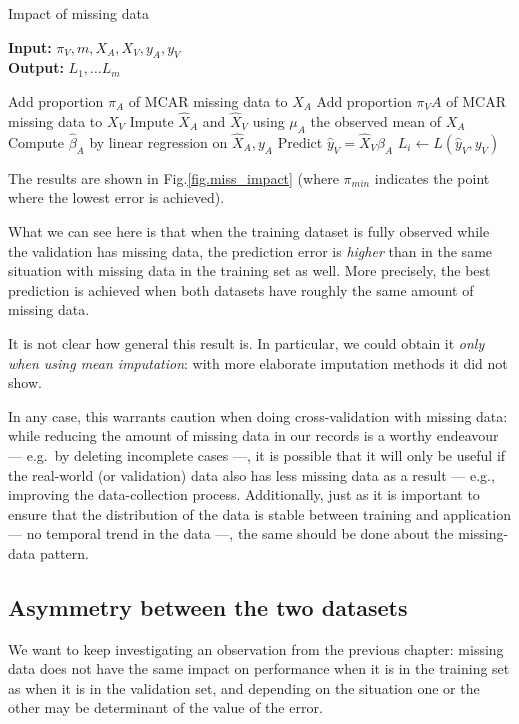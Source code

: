 \begin{algorithm}[H]
	\caption{Impact of missing data}
	\hspace*{\algorithmicindent} \textbf{Input:} $\pi_V, m, X_A, X_V, y_A,y_V$  \\
	\hspace*{\algorithmicindent} \textbf{Output:} $L_1, \ldots L_m$  \\
	\begin{algorithmic}[1]
			\State Add proportion $\pi_A$ of MCAR missing data to $X_A$
			\State Add proportion $\pi_VA$ of MCAR missing data to $X_V$
			\State Impute $\hat{X}_A$ and $\hat{X}_V$ using $\mu_A$ the observed mean of $X_A$
			\State Compute $\hat{\beta}_A$ by linear regression on $\hat{X}_A, y_A$
			\State Predict $\hat{y}_V = \hat{X}_V \hat{\beta}_A$
			\State $L_i \leftarrow L(\hat{y}_V, y_V)$
		\EndFor
	\end{algorithmic}
\end{algorithm}

The results are shown in Fig.\ref{fig.miss_impact} (where $\pi_{min}$ indicates the point where the lowest error is achieved).



What we can see here is that when the training dataset is fully observed while the validation has missing data, the prediction error is \emph{higher} than in the same situation with missing data in the training set as well. More precisely, the best prediction is achieved when both datasets have roughly the same amount of missing data.

It is not clear how general this result is. In particular, we could obtain it \emph{only when using mean imputation}: with more elaborate imputation methods it did not show. 

 In any case, this warrants caution when doing cross-validation with missing data: while reducing the amount of missing data in our records is a worthy endeavour --- e.g.\ by deleting incomplete cases ---, it is possible that it will only be useful if the real-world (or validation) data also has less missing data as a result --- e.g., improving the data-collection process. Additionally, just as it is important to ensure that the distribution of the data is stable between training and application --- no temporal trend in the data ---, the same should be done about the missing-data pattern.

		\subsection{Asymmetry between the two datasets}
We want to keep investigating an observation from the previous chapter: missing data does not have the same impact on performance when it is in the training set as when it is in the validation set, and depending on the situation one or the other may be determinant of the value of the error.

